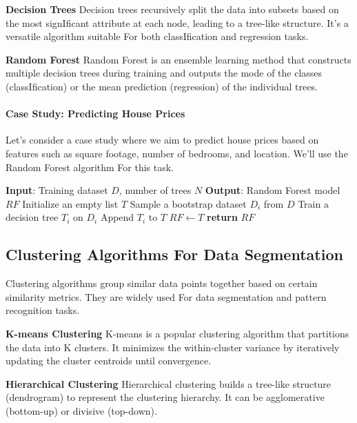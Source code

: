 \documentclass[12pt]{book} %
\begin{document}
\textbf{Decision Trees}
Decision trees recursively split the data into subsets based on the most signIficant attribute at each node, leading to a tree-like structure. It's a versatile algorithm suitable For both classIfication and regression tasks.

\textbf{Random Forest}
Random Forest is an ensemble learning method that constructs multiple decision trees during training and outputs the mode of the classes (classIfication) or the mean prediction (regression) of the individual trees.

\paragraph{Case Study: Predicting House Prices}
Let's consider a case study where we aim to predict house prices based on features such as square footage, number of bedrooms, and location. We'll use the Random Forest algorithm For this task.
\FloatBarrier
\begin{algorithm}[H]
\caption{Random Forest For House Price Prediction}\label{alg:random_Forest}
\begin{algorithmic}[1]
\State \textbf{Input}: Training dataset $D$, number of trees $N$
\State \textbf{Output}: Random Forest model $RF$
\State Initialize an empty list $T$
    \State Sample a bootstrap dataset $D_i$ from $D$
    \State Train a decision tree $T_i$ on $D_i$
    \State Append $T_i$ to $T$
\EndFor
\State $RF \gets T$
\State \textbf{return} $RF$
\end{algorithmic}
\end{algorithm}
\FloatBarrier

\subsection{Clustering Algorithms For Data Segmentation}

Clustering algorithms group similar data points together based on certain similarity metrics. They are widely used For data segmentation and pattern recognition tasks.

\textbf{K-means Clustering}
K-means is a popular clustering algorithm that partitions the data into K clusters. It minimizes the within-cluster variance by iteratively updating the cluster centroids until convergence.

\textbf{Hierarchical Clustering}
Hierarchical clustering builds a tree-like structure (dendrogram) to represent the clustering hierarchy. It can be agglomerative (bottom-up) or divisive (top-down).
\end{document}
